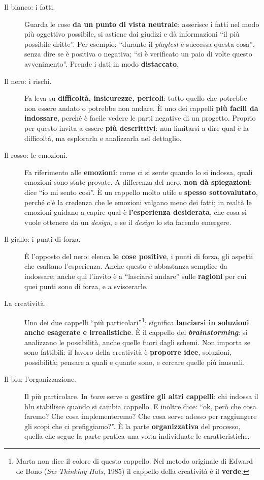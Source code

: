 \begin{description}
  \item[Il bianco: i fatti.] Guarda le cose \textbf{da un punto di vista neutrale}: asserisce
        i fatti nel modo più oggettivo possibile, si astiene dai giudizi e dà informazioni
        ``il più possibile dritte''. Per esempio: ``durante il \emph{playtest} è successa
        questa cosa'', senza dire se è positiva o negativa; ``si è verificato un paio di
        volte questo avvenimento''. Prende i dati in modo \textbf{distaccato}.
  \item[Il nero: i rischi.] Fa leva su \textbf{difficoltà, insicurezze, pericoli}: tutto
        quello che potrebbe non essere andato o potrebbe non andare. È uno dei cappelli
        \textbf{più facili da indossare}, perché è facile vedere le parti negative di un
        progetto. Proprio per questo invita a essere \textbf{più descrittivi}: non limitarsi
        a dire qual è la difficoltà, ma esplorarla e analizzarla nel dettaglio.
  \item[Il rosso: le emozioni.] Fa riferimento alle \textbf{emozioni}: come ci si sente
        quando lo si indossa, quali emozioni sono state provate. A differenza del nero,
        \textbf{non dà spiegazioni}: dice ``io mi sento così''. È un cappello molto utile e
        \textbf{spesso sottovalutato}, perché c'è la credenza che le emozioni valgano meno
        dei fatti; in realtà le emozioni guidano a capire qual è \textbf{l'esperienza
        desiderata}, che cosa si vuole ottenere da un \emph{design}, e se il \emph{design} lo
        sta facendo emergere.
  \item[Il giallo: i punti di forza.] È l'opposto del nero: elenca \textbf{le cose positive},
        i punti di forza, gli aspetti che esaltano l'esperienza. Anche questo è abbastanza
        semplice da indossare; anche qui l'invito è a ``lasciarsi andare'' sulle
        \textbf{ragioni} per cui quei punti sono di forza, e a sviscerarle.
  \item[La creatività.] Uno dei due cappelli ``più particolari''\footnote{Marta non dice il
        colore di questo cappello. Nel metodo originale di Edward de Bono (\emph{Six Thinking
        Hats}, 1985) il cappello della creatività è il \textbf{verde}.}: significa
        \textbf{lanciarsi in soluzioni anche esagerate e irrealistiche}. È il cappello del
        \textbf{\emph{brainstorming}}: si analizzano le possibilità, anche quelle fuori dagli
        schemi. Non importa se sono fattibili: il lavoro della creatività è \textbf{proporre
        idee}, soluzioni, possibilità; pensare a quali e quante sono, e cercare quelle più
        inusuali.
  \item[Il blu: l'organizzazione.] Il più particolare. In \emph{team} serve a
        \textbf{gestire gli altri cappelli}: chi indossa il blu stabilisce quando si cambia
        cappello. E inoltre dice: ``ok, però che cosa faremo? Che cosa implementeremo? Che
        cosa serve adesso per raggiungere gli scopi che ci prefiggiamo?''. È la parte
        \textbf{organizzativa} del processo, quella che segue la parte pratica una volta
        individuate le caratteristiche.
\end{description}


